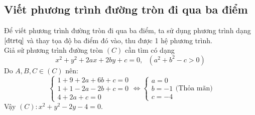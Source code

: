 \subsection{Viết phương trình đường tròn đi qua ba điểm}
Để viết phương trình đường tròn đi qua ba điểm, ta sử dụng phương trình dạng $\eqref{dtrtq}$ và thay tọa độ ba điểm đó vào, thu được 1 hệ phương trình.\\
\lgi
Giả sử phương trình đường tròn $\left(C \right)$ cần tìm có dạng 
\begin{equation*}
x^2 + y^2 + 2ax + 2by + c = 0, \ \ \ (a^2 + b^2-c > 0)
\end{equation*}
Do $A,B,C \in \left(C \right)$ nên:
$$\begin{cases}1+9+2a+6b+c=0 \\ 1+ 1-2a-2b+c=0 \\4+2a+c=0\end{cases}\Leftrightarrow \begin{cases}a=0 \\ b=-1 \\c=-4\end{cases} \text{(Thỏa mãn)}$$
Vậy $\left(C\right):x^2+y^2-2y-4=0.$
